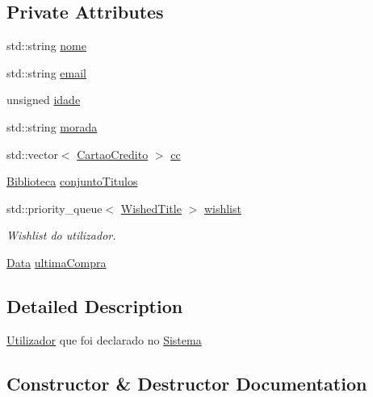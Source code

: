 \subsection*{Private Attributes}
\begin{DoxyCompactItemize}
\item 
std\+::string \mbox{\hyperlink{class_utilizador_ace8fd0a2f9414413e2966c8366e62b19}{nome}}
\item 
std\+::string \mbox{\hyperlink{class_utilizador_a3663b1ff4632d292c0b3476a960c06a7}{email}}
\item 
unsigned \mbox{\hyperlink{class_utilizador_a6bbed097ba3eeeae71b777b30b478ec2}{idade}}
\item 
std\+::string \mbox{\hyperlink{class_utilizador_ab94b7e2f13eb757c2cb98104fc69ac8c}{morada}}
\item 
std\+::vector$<$ \mbox{\hyperlink{class_cartao_credito}{Cartao\+Credito}} $>$ \mbox{\hyperlink{class_utilizador_a06fb986d77ace5547f107b6a5ce10c5e}{cc}}
\item 
\mbox{\hyperlink{class_biblioteca}{Biblioteca}} \mbox{\hyperlink{class_utilizador_a82e5a6ecf4dc5c5fa4397f6f3caa0484}{conjunto\+Titulos}}
\item 
std\+::priority\+\_\+queue$<$ \mbox{\hyperlink{class_wished_title}{Wished\+Title}} $>$ \mbox{\hyperlink{class_utilizador_a5c315459135b6ec84639951b52bfd551}{wishlist}}
\begin{DoxyCompactList}\small\item\em Wishlist do utilizador. \end{DoxyCompactList}\item 
\mbox{\hyperlink{class_data}{Data}} \mbox{\hyperlink{class_utilizador_acd065552d8fd82a50a3c66f7b67df971}{ultima\+Compra}}
\end{DoxyCompactItemize}


\subsection{Detailed Description}
\mbox{\hyperlink{class_utilizador}{Utilizador}} que foi declarado no \mbox{\hyperlink{class_sistema}{Sistema}} 

\subsection{Constructor \& Destructor Documentation}
\mbox{\label{class_utilizador_ac4d4e41d09c17ea0b1c5bf4bcda4b6a8}} 
